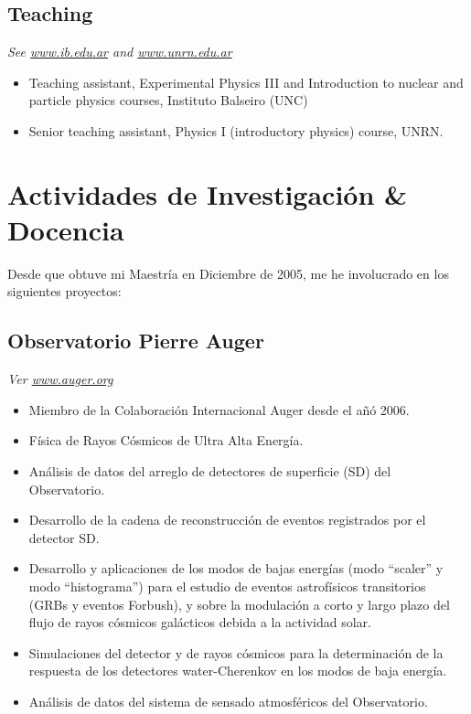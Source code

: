 \subsection*{Teaching}
{\small{\textit{See \href{http://www.ib.edu.ar}{www.ib.edu.ar} and
\href{http://www.unrn.edu.ar}{www.unrn.edu.ar}}}}
\begin{itemize}
\item Teaching assistant, Experimental Physics III and Introduction to nuclear
and particle physics courses, Instituto Balseiro (UNC)
\item Senior teaching assistant, Physics I (introductory physics) course, UNRN.
\end{itemize}
\else
\section*{Actividades de Investigación \& Docencia}

Desde que obtuve mi Maestría en Diciembre de 2005, me he involucrado en los siguientes proyectos:

\subsection*{Observatorio Pierre Auger}

{\small{\textit{Ver \href{http://www.auger.org/}{www.auger.org}}}}
\begin{itemize}
\item Miembro de la Colaboración Internacional Auger desde el añó 2006.
\item Física de Rayos Cósmicos de Ultra Alta Energía.
\item Análisis de datos del arreglo de detectores de superficie (SD) del Observatorio.
\item Desarrollo de la cadena de reconstrucción de eventos registrados por el detector SD.
\item Desarrollo y aplicaciones de los modos de bajas energías (modo ``scaler'' y modo ``histograma'') para el estudio de eventos astrofísicos transitorios (GRBs y eventos Forbush), y sobre la modulación a corto y largo plazo del flujo de rayos cósmicos galácticos debida a la actividad solar.
\item Simulaciones del detector y de rayos cósmicos para la determinación de la respuesta de los detectores water-Cherenkov en los modos de baja energía.
\item Análisis de datos del sistema de sensado atmosféricos del Observatorio.
\end{itemize}

